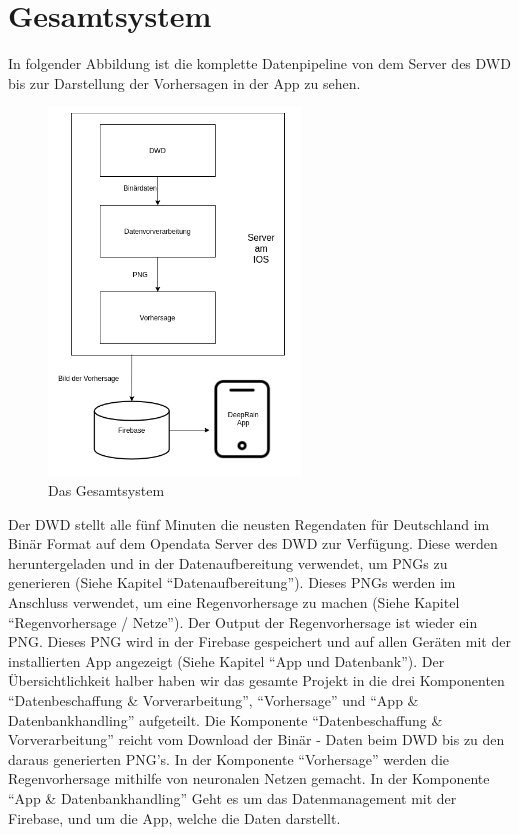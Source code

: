 \section{Gesamtsystem}\label{gesamtsystem}
In folgender Abbildung ist die komplette Datenpipeline von dem Server des DWD bis zur Darstellung der Vorhersagen in der App zu sehen.  

\begin{figure}[htb]
 \centering
 \includegraphics[width=0.6\textwidth,angle=0]{abb/Gesamtsystem}
 \caption[Das Gesamtsystem]{Das Gesamtsystem}
\label{fig:Beschreibung}
\end{figure}
\begin{sloppypar}
    Der DWD stellt alle fünf Minuten die neusten Regendaten für Deutschland im Binär Format auf dem Opendata Server des DWD zur Verfügung. 
    Diese werden heruntergeladen und in der Datenaufbereitung verwendet, um PNGs zu generieren (Siehe Kapitel “Datenaufbereitung”). 
    Dieses PNGs werden im Anschluss verwendet, um eine Regenvorhersage zu machen (Siehe Kapitel “Regenvorhersage / Netze”). 
    Der Output der Regenvorhersage ist wieder ein PNG. 
    Dieses PNG wird in der Firebase gespeichert und auf allen Geräten mit der installierten App angezeigt (Siehe Kapitel “App und Datenbank”). 
    Der Übersichtlichkeit halber haben wir das gesamte Projekt in die drei Komponenten “Datenbeschaffung \& Vorverarbeitung”, “Vorhersage” und
    “App \& Datenbankhandling” aufgeteilt. 
    Die Komponente “Datenbeschaffung \& Vorverarbeitung” reicht vom Download der Binär - Daten beim DWD bis zu den daraus generierten PNG’s. 
    In der Komponente “Vorhersage” werden die Regenvorhersage mithilfe von neuronalen Netzen gemacht. In der Komponente “App \& Datenbankhandling” 
    Geht es um das Datenmanagement mit der Firebase, und um die App, welche die Daten darstellt.
\end{sloppypar}